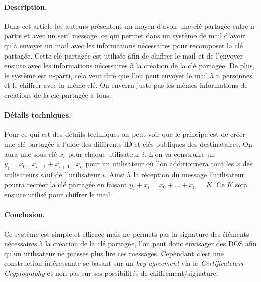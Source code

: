 \paragraph*{Description.} Dans cet article les auteurs présentent un moyen d'avoir une clé partagée entre n-partis et avec un seul message, ce qui permet dans un système de mail d'avoir qu'à envoyer un mail avec les informations nécessaires pour recomposer la clé partagée. Cette clé partagée est utilisée afin de chiffrer le mail et de l'envoyer ensuite avec les informations nécessaires à la création de la clé partagée. De plus, le système est n-parti, cela veut dire que l'on peut envoyer le mail à n personnes et le chiffrer avec la même clé. On enverra juste pas les mêmes informations de créations de la clé partagée à tous.
\paragraph*{Détails techniques.} Pour ce qui est des détails techniques on peut voir que le principe est de créer une clé partagée à l'aide des différents ID et clés publiques des destinataires. On aura une sous-clé $x_i$ pour chaque utilisateur $i$. L'on va construire un $y_i = x_0 \dots x_{i-1} + x_{i+1} \dots x_n$ pour un utilisateur où l'on additionnera tout les $x$ des utilisateurs sauf de l'utilisateur $i$. Ainsi à la réception du message l'utilisateur pourra recréer la clé partagée en faisant $y_i + x_i = x_0 + \dots + x_n = K$. Ce $K$ sera ensuite utilisé pour chiffrer le mail.
\paragraph*{Conclusion.} Ce système est simple et efficace mais ne permets pas la signature des éléments nécessaires à la création de la clé partagée, l'on peut donc envisager des DOS afin qu'un utilisateur ne puisses plus lire ces messages. Cependant c'est une construction intéressante se basant sur un \textit{key-agreement} via le \textit{Certificateless Cryptography} et non pas sur ses possibilités de chiffrement/signature.



